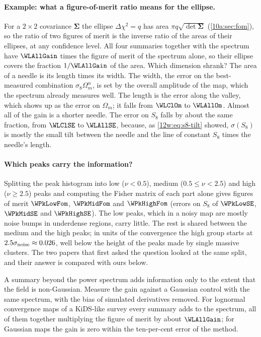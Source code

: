 \paragraph{Example: what a figure-of-merit ratio means for the ellipse.}
For a $2\times2$ covariance $\bm\Sigma$ the ellipse $\Delta\chi^2=q$ has area $\pi q\sqrt{\det\bm\Sigma}$
(\cref{10a:sec:fom}), so the ratio of two figures of merit is the inverse ratio of the areas of their ellipses, at any
confidence level. All four summaries together with the spectrum have $\WLAllGain$ times the figure of merit of the
spectrum alone, so their ellipse covers the fraction $1/\WLAllGain$ of the area. Which dimension shrank? The area of a
needle is its length times its width. The width, the error on the best-measured combination $\sigma_8\Omega_m^\alpha$,
is set by the overall amplitude of the map, which the spectrum already measures well. The length is the error along
the valley, which shows up as the error on $\Omega_m$; it falls from $\WLClOm$ to $\WLAllOm$. Almost all of the gain
is a shorter needle. The error on $S_8$ falls by about the same fraction, from $\WLClSE$ to $\WLAllSE$, because, as
\eqref{12w:eq:s8-tilt} showed, $\sigma(S_8)$ is mostly the small tilt between the needle and the line of constant
$S_8$ times the needle's length.

\paragraph{Which peaks carry the information?} Splitting the peak histogram into low ($\nu<0.5$), medium
($0.5\le\nu<2.5$) and high ($\nu\ge2.5$) peaks and computing the Fisher matrix of each part alone gives figures of
merit $\WPkLowFom$, $\WPkMidFom$ and $\WPkHighFom$ (errors on $S_8$ of $\WPkLowSE$, $\WPkMidSE$ and $\WPkHighSE$).
The low peaks, which in a noisy map are mostly noise bumps in underdense regions, carry little. The rest is shared
between the medium and the high peaks; in units of the convergence the high group starts at
$2.5\sigma_{\rm noise}\approx0.026$, well below the height of the peaks made by single massive clusters. The two papers that first asked the question looked at the same split, and their answer
is compared with ours below.

\begin{keyidea}
A summary beyond the power spectrum adds information only to the extent that the field is non-Gaussian. Measure the
gain against a Gaussian control with the same spectrum, with the bias of simulated derivatives removed. For lognormal
convergence maps of a KiDS-like survey every summary adds to the spectrum, all of them together multiplying the
figure of merit by about $\WLAllGain$; for Gaussian maps the gain is zero within the ten-per-cent error of the method.
\end{keyidea}

